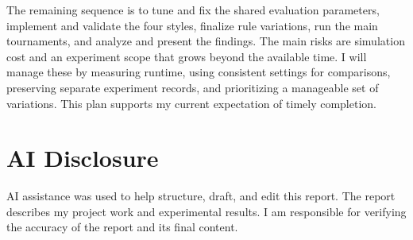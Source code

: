 \documentclass[12pt,twoside]{article}
\begin{document}
The remaining sequence is to tune and fix the shared evaluation parameters,
implement and validate the four styles, finalize rule variations, run the main
tournaments, and analyze and present the findings. The main risks are simulation
cost and an experiment scope that grows beyond the available time. I will manage
these by measuring runtime, using consistent settings for comparisons,
preserving separate experiment records, and prioritizing a manageable set of
variations. This plan supports my current expectation of timely completion.

\section*{AI Disclosure}

AI assistance was used to help structure, draft, and edit this report. The
report describes my project work and experimental results. I am responsible
for verifying the accuracy of the report and its final content.
\end{document}
